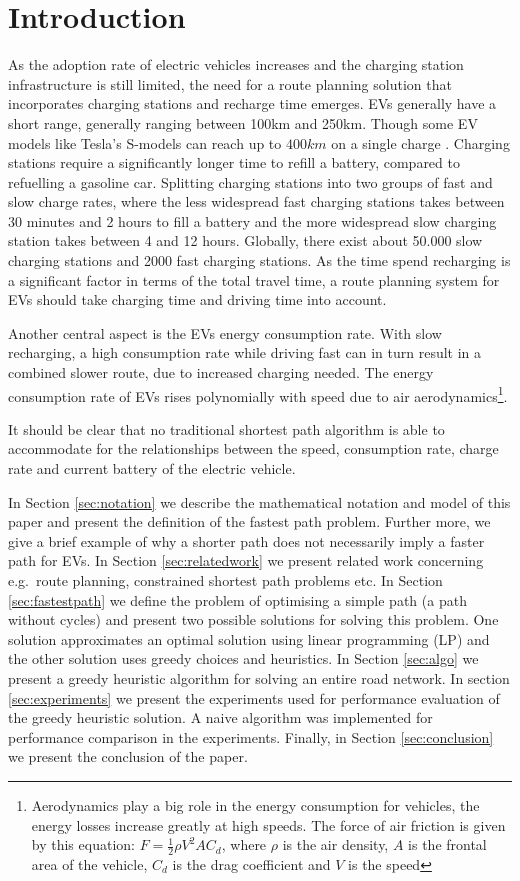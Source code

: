\section{Introduction}

As the adoption rate of electric vehicles increases \cite{Henry2013} and the charging station infrastructure is still limited, the need for a route planning solution that incorporates charging stations and recharge time emerges. EVs generally have a short range, generally ranging between 100km and 250km. Though some EV models like Tesla's S-models can reach up to $400\si{km}$ on a single charge \cite{teslacon}. Charging stations require a significantly longer time to refill a battery, compared to refuelling a gasoline car. Splitting charging stations into two groups of fast and slow charge rates, where the less widespread fast charging stations takes between 30 minutes and 2 hours to fill a battery and the more widespread slow charging station takes between 4 and 12 hours. Globally, there exist about 50.000 slow charging stations and 2000 fast charging stations\cite{Globalevoutlook}. As the time spend recharging is a significant factor in terms of the total travel time, a route planning system for EVs should take charging time and driving time into account.

Another central aspect is the EVs energy consumption rate. With slow recharging, a high consumption rate while driving fast can in turn result in a combined slower route, due to increased charging needed. The energy consumption rate of EVs rises polynomially with speed due to air aerodynamics\footnote{Aerodynamics play a big role in the energy consumption for vehicles, the energy losses increase greatly at high speeds. The force of air friction is given by this equation: $F = \frac{1}{2} \rho V^2 A C_d$, where $\rho$ is the air density, $A$ is the frontal area of the vehicle, $C_d$ is the drag coefficient and $V$ is the speed}.

It should be clear that no traditional shortest path algorithm is able to accommodate for the relationships between the speed, consumption rate, charge rate and current battery of the electric vehicle. 

In Section \ref{sec:notation} we describe the mathematical notation and model of this paper and present the definition of the fastest path problem. Further more, we give a brief example of why a shorter path does not necessarily imply a faster path for EVs. In Section \ref{sec:relatedwork} we present related work concerning e.g.\ route planning, constrained shortest path problems etc. In Section \ref{sec:fastestpath} we define the problem of optimising a simple path (a path without cycles) and present two possible solutions for solving this problem. One solution approximates an optimal solution using linear programming (LP) and the other solution uses greedy choices and heuristics. In Section \ref{sec:algo} we present a greedy heuristic algorithm for solving an entire road network. In section \ref{sec:experiments} we present the experiments used for performance evaluation of the greedy heuristic solution. A naive algorithm was implemented for performance comparison in the experiments. Finally, in Section \ref{sec:conclusion} we present the conclusion of the paper.    